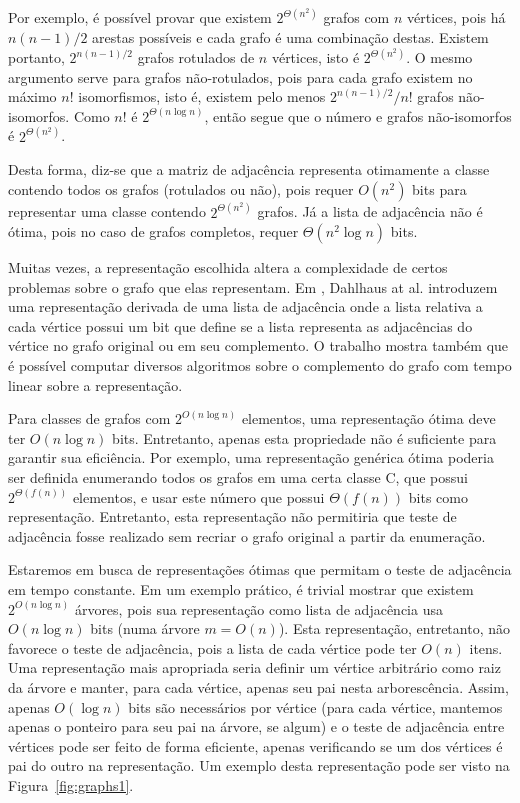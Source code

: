 Por exemplo, é possível provar que existem $2^{\Theta(n^2)}$ grafos com $n$ vértices, pois há $n (n-1)/2$ arestas possíveis e cada grafo é uma combinação destas. Existem portanto, $2^{n (n-1) / 2}$ grafos rotulados de $n$ vértices, isto é $2^{\Theta(n^2)}$. O mesmo argumento serve para grafos não-rotulados, pois para cada grafo existem no máximo $n!$ isomorfismos, isto é, existem pelo menos $2^{n (n-1) / 2} / n!$ grafos não-isomorfos. Como $n!$ é $2^{\Theta(n \log n)}$, então segue que o número e grafos não-isomorfos é $2^{\Theta(n^2)}$.

Desta forma, diz-se que a matriz de adjacência representa otimamente a classe contendo todos os grafos (rotulados ou não), pois requer $O(n^2)$ bits para representar uma classe contendo $2^{\Theta({n^2})}$ grafos. Já a lista de adjacência não é ótima, pois no caso de grafos completos, requer $\Theta(n^2 \log n)$ bits.

Muitas vezes, a representação escolhida altera a complexidade de certos problemas sobre o grafo que elas representam. Em \cite{dahlhaus2002partially}, Dahlhaus at al. introduzem uma representação derivada de uma lista de adjacência onde a lista relativa a cada vértice possui um bit que define se a lista representa as adjacências do vértice no grafo original ou em seu complemento. O trabalho mostra também que é possível computar diversos algoritmos sobre o complemento do grafo com tempo linear sobre a representação.

Para classes de grafos com $2^{O(n\log n)}$ elementos, uma representação ótima deve ter $O(n\log n)$ bits. Entretanto, apenas esta propriedade não é suficiente para garantir sua eficiência. Por exemplo, uma representação genérica ótima poderia ser definida enumerando todos os grafos em uma certa classe C, que possui $2^{\Theta(f(n))}$ elementos, e usar este número que possui $\Theta(f(n))$ bits como representação. Entretanto, esta representação não permitiria que teste de adjacência fosse realizado sem recriar o grafo original a partir da enumeração.

Estaremos em busca de representações ótimas que permitam o teste de adjacência em tempo constante. Em um exemplo prático, é trivial mostrar que existem $2^{O(n\log n)}$ árvores, pois sua representação como lista de adjacência usa $O(n \log n)$ bits (numa árvore $m = O(n)$). Esta representação, entretanto, não favorece o teste de adjacência, pois a lista de cada vértice pode ter $O(n)$ itens. Uma representação mais apropriada seria definir um vértice arbitrário como raiz da árvore e manter, para cada vértice, apenas seu pai nesta arborescência. Assim, apenas $O(\log n)$ bits são necessários por vértice (para cada vértice, mantemos apenas o ponteiro para seu pai na árvore, se algum) e o teste de adjacência entre vértices pode ser feito de forma eficiente, apenas verificando se um dos vértices é pai do outro na representação. Um exemplo desta representação pode ser visto na Figura~\ref{fig:graphs1}. 

